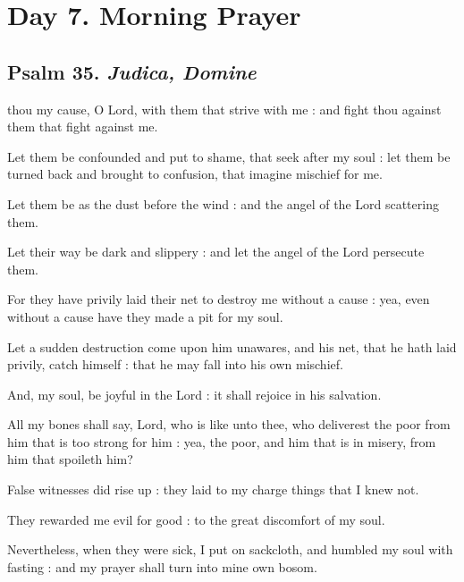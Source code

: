\clearpage
\section*{Day 7. Morning Prayer}

\subsection{Psalm 35. \textit{Judica, Domine}}

 thou my cause, O Lord, with them that strive with me : and fight thou against them that fight against me.\par
{}
Let them be confounded and put to shame, that seek after my soul : let them be turned back and brought to confusion, that imagine mischief for me.\par
{}Let them be as the dust before the wind : and the angel of the Lord scattering them.\par
{}Let their way be dark and slippery : and let the angel of the Lord persecute them.\par
{}For they have privily laid their net to destroy me without a cause : yea, even without a cause have they made a pit for my soul.\par
{}Let a sudden destruction come upon him unawares, and his net, that he hath laid privily, catch himself : that he may fall into his own mischief.\par
{}And, my soul, be joyful in the Lord : it shall rejoice in his salvation.\par
{}All my bones shall say, Lord, who is like unto thee, who deliverest the poor from him that is too strong for him : yea, the poor, and him that is in misery, from him that spoileth him?\par
{}False witnesses did rise up : they laid to my charge things that I knew not.\par
{}They rewarded me evil for good : to the great discomfort of my soul.\par
{}Nevertheless, when they were sick, I put on sackcloth, and humbled my soul with fasting : and my prayer shall turn into mine own bosom.\par
